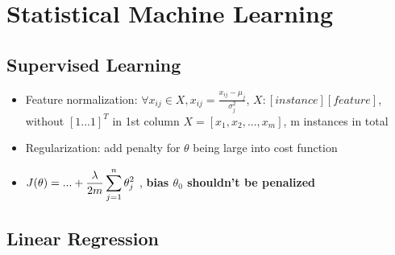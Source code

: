\chapter{Statistical Machine Learning}

\section{Supervised Learning}
\begin{itemize}

\item Feature normalization: $\forall x_{ij} \in X, x_{ij}=\frac{x_{ij}-\mu_j}{\sigma_j^2}$, $ X:[instance][feature]$, without $[1...1]^T$ in 1st column $X=[x_1,x_2,...,x_m]$, m instances in total
\item Regularization: add penalty for $\theta$ being large into cost function
\item $\displaystyle J(\theta)= \space... + \frac{\lambda}{2m}\sum^n_{j=1}\theta_j^2$ , \textbf{bias $\theta_0$ shouldn't be penalized} 

\end{itemize}

\section{Linear Regression}

